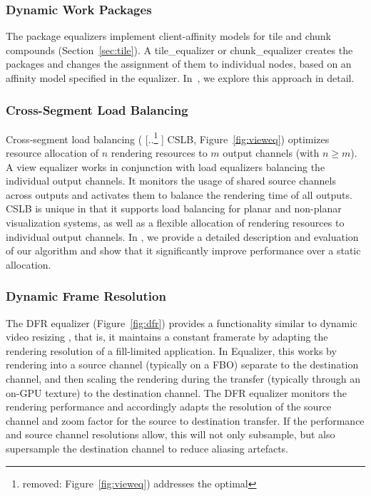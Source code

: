 \documentclass[10pt,journal,compsoc]{IEEEtran}
\newcommand{\sref}[1]{Section~\ref{#1}}
\newcommand{\fig}[1]{Figure~\ref{#1}}
\providecommand{\DIFaddtex}[1]{{\protect\color{blue} \sf #1}} %
\providecommand{\DIFdeltex}[1]{{\protect\color{red} [..\footnote{removed: #1} ]}} %
\providecommand{\DIFaddbegin}{} %
\providecommand{\DIFaddend}{} %
\providecommand{\DIFdelbegin}{} %
\providecommand{\DIFdelend}{} %
\providecommand{\DIFadd}[1]{\texorpdfstring{\DIFaddtex{#1}}{#1}} %
\providecommand{\DIFdel}[1]{\texorpdfstring{\DIFdeltex{#1}}{}} %
\newcommand{\DIFscaledelfig}{0.5}
\newlength{\DIFdelgraphicswidth} %
\newlength{\DIFdelgraphicsheight} %
\newcommand{\DIFaddincludegraphics}[2][]{{\color{blue}\fbox{\DIFOincludegraphics[#1]{#2}}}} %
\newcommand{\DIFdelincludegraphics}[2][]{%
\sbox{\DIFdelgraphicsbox}{\DIFOincludegraphics[#1]{#2}}%
\settoboxwidth{\DIFdelgraphicswidth}{\DIFdelgraphicsbox} %
\settoboxtotalheight{\DIFdelgraphicsheight}{\DIFdelgraphicsbox} %
\scalebox{\DIFscaledelfig}{%
\parbox[b]{\DIFdelgraphicswidth}{\usebox{\DIFdelgraphicsbox}\\[-\baselineskip] \rule{\DIFdelgraphicswidth}{0em}}\llap{\resizebox{\DIFdelgraphicswidth}{\DIFdelgraphicsheight}{%
\setlength{\unitlength}{\DIFdelgraphicswidth}%
\begin{picture}(1,1)%
\thicklines\linethickness{2pt} %
{\color[rgb]{1,0,0}\put(0,0){\framebox(1,1){}}}%
{\color[rgb]{1,0,0}\put(0,0){\line( 1,1){1}}}%
{\color[rgb]{1,0,0}\put(0,1){\line(1,-1){1}}}%
\end{picture}%
}\hspace*{3pt}}} %
} %
\DeclareRobustCommand{\DIFaddbegin}{\DIFOaddbegin \let\includegraphics\DIFaddincludegraphics} %
\DeclareRobustCommand{\DIFaddend}{\DIFOaddend \let\includegraphics\DIFOincludegraphics} %
\DeclareRobustCommand{\DIFdelbegin}{\DIFOdelbegin \let\includegraphics\DIFdelincludegraphics} %
\DeclareRobustCommand{\DIFdelend}{\DIFOaddend \let\includegraphics\DIFOincludegraphics} %
\begin{document}
\subsubsection{Dynamic Work Packages}

The package equalizers implement client-affinity models for tile and chunk
compounds (\sref{sec:tile}). A \textsf{tile\_equalizer} or
\textsf{chunk\_equalizer} creates the packages and changes the assignment of them
to individual nodes, based on an affinity model specified in the equalizer.
In~\cite{SPEP:16}, we explore this approach in detail.

\subsubsection{Cross-Segment Load Balancing}

Cross-segment load balancing (\DIFdelbegin \DIFdel{\fig{fig:vieweq}) addresses the optimal }\DIFdelend \DIFaddbegin \DIFadd{CSLB, \fig{fig:vieweq}) optimizes }\DIFaddend resource
allocation of $n$ rendering resources to $m$ output channels (with $n\geq m$).
A view equalizer works in conjunction with load equalizers balancing the
individual output channels. It monitors the usage of shared source channels
across outputs and activates them to balance the rendering time of all outputs.
\DIFaddbegin \DIFadd{CSLB is unique in that it supports load balancing for planar and non-planar
visualization systems, as well as a flexible allocation of rendering resources
to individual output channels. }\DIFaddend In \cite{EEP:11}, we provide a detailed
description and evaluation of our algorithm \DIFaddbegin \DIFadd{and show that it significantly
improve performance over a static allocation}\DIFaddend .

\subsubsection{Dynamic Frame Resolution}

The DFR equalizer (\fig{fig:dfr}) provides a functionality similar to dynamic
video resizing \cite{MBDM:97}, that is, it maintains a constant framerate by
adapting the rendering resolution of a fill-limited application. In
\textsf{Equalizer}, this works by rendering into a source channel (typically on
a FBO) separate to the destination channel, and then scaling the rendering
during the transfer (typically through an on-GPU texture) to the destination
channel. The DFR equalizer monitors the rendering performance and accordingly
adapts the resolution of the source channel and zoom factor for the source to
destination transfer. If the performance and source channel resolutions allow,
this will not only subsample, but also supersample the destination channel to
reduce aliasing artefacts.
\end{document}
